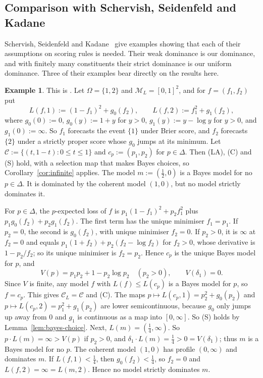 \documentclass[11pt]{article}
\theoremstyle{definition}
\newtheorem{example}[theorem]{Example}
\theoremstyle{remark}
\newcommand{\M}{\mathcal M}
\newcommand{\C}{\mathcal C}
\begin{document}
\subsection{Comparison with Schervish, Seidenfeld and Kadane}\label{sec:ssk}
Schervish, Seidenfeld and Kadane~\cite{SSK09} give examples showing that each of their assumptions on scoring rules is needed. Their weak dominance is our dominance, and with finitely many constituents their strict dominance is our uniform dominance. Three of their examples bear directly on the results here.
\begin{example}\label{ex:ssk-sharp}
This is \cite[Example~2]{SSK09}. Let $\Omega=\{1,2\}$ and $\M_L=[0,1]^2$, and for $f=(f_1,f_2)$ put
\[
 L(f,1):=(1-f_1)^2+g_0(f_2),\qquad L(f,2):=f_1^2+g_1(f_2),
\]
where $g_0(0):=0$, $g_0(y):=1+y$ for $y>0$, $g_1(y):=y-\log y$ for $y>0$, and $g_1(0):=\infty$. So $f_1$ forecasts the event $\{1\}$ under Brier score, and $f_2$ forecasts $\{2\}$ under a strictly proper score whose $g_0$ jumps at its minimum. Let $\C:=\{(t,1-t):0\le t\le1\}$ and $c_p:=(p_1,p_2)$ for $p\in\Delta$. Then (LA), (C) and (S) hold, with a selection map that makes Bayes choices, so Corollary~\ref{cor:infinite} applies. The model $m:=(\tfrac12,0)$ is a Bayes model for no $p\in\Delta$. It is dominated by the coherent model $(1,0)$, but no model strictly dominates it.
\end{example}
For $p\in\Delta$, the $p$-expected loss of $f$ is $p_1(1-f_1)^2+p_2f_1^2$ plus $p_1g_0(f_2)+p_2g_1(f_2)$. The first term has the unique minimiser $f_1=p_1$. If $p_2=0$, the second is $g_0(f_2)$, with unique minimiser $f_2=0$. If $p_2>0$, it is $\infty$ at $f_2=0$ and equals $p_1(1+f_2)+p_2(f_2-\log f_2)$ for $f_2>0$, whose derivative is $1-p_2/f_2$; so its unique minimiser is $f_2=p_2$. Hence $c_p$ is the unique Bayes model for $p$, and
\[
 V(p)=p_1p_2+1-p_2\log p_2\quad(p_2>0),\qquad V(\delta_1)=0.
\]
Since $V$ is finite, any model $f$ with $L(f)\le L(c_p)$ is a Bayes model for $p$, so $f=c_p$. This gives $\C_L=\C$ and (C). The maps $p\mapsto L(c_p,1)=p_2^2+g_0(p_2)$ and $p\mapsto L(c_p,2)=p_1^2+g_1(p_2)$ are lower semicontinuous, because $g_0$ only jumps up away from $0$ and $g_1$ is continuous as a map into $[0,\infty]$. So (S) holds by Lemma~\ref{lem:bayes-choice}. Next, $L(m)=(\tfrac14,\infty)$. So $p\cdot L(m)=\infty>V(p)$ if $p_2>0$, and $\delta_1\cdot L(m)=\tfrac14>0=V(\delta_1)$; thus $m$ is a Bayes model for no $p$. The coherent model $(1,0)$ has profile $(0,\infty)$ and dominates $m$. If $L(f,1)<\tfrac14$, then $g_0(f_2)<\tfrac14$, so $f_2=0$ and $L(f,2)=\infty=L(m,2)$. Hence no model strictly dominates $m$.
\end{document}
